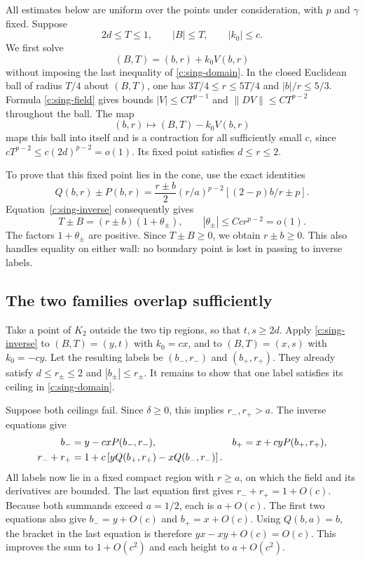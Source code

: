 All estimates below are uniform over the points under consideration,
with $p$ and $\gamma$ fixed.  Suppose
\[
 2d\le T\le1,\qquad |B|\le T,\qquad |k_0|\le c.
\]
We first solve
\begin{equation}
 (B,T)=(b,r)+k_0V(b,r)
 \label{c:sing-inverse}
\end{equation}
without imposing the last inequality of \eqref{c:sing-domain}.
In the closed Euclidean ball of radius $T/4$ about $(B,T)$, one has
$3T/4\le r\le5T/4$ and $|b|/r\le5/3$.  Formula
\eqref{c:sing-field} gives bounds
$|V|\le C T^{p-1}$ and $\|DV\|\le C T^{p-2}$ throughout the ball.
The map
\[
 (b,r)\longmapsto(B,T)-k_0V(b,r)
\]
maps this ball into itself and is a contraction for all sufficiently
small $c$, since $cT^{p-2}\le c(2d)^{p-2}=o(1)$.
Its fixed point satisfies $d\le r\le2$.

To prove that this fixed point lies in the cone, use the exact identities
\begin{equation}
 Q(b,r)\pm P(b,r)
   =\frac{r\pm b}{2}(r/a)^{p-2}
                      \left[(2-p)b/r\pm p\right].
 \label{c:sing-wall-factorization}
\end{equation}
Equation~\eqref{c:sing-inverse} consequently gives
\[
 T\pm B=(r\pm b)(1+\theta_\pm),\qquad
 |\theta_\pm|\le Cc r^{p-2}=o(1).
\]
The factors $1+\theta_\pm$ are positive.  Since $T\pm B\ge0$, we
obtain $r\pm b\ge0$.  This also handles equality on either wall:
no boundary point is lost in passing to inverse labels.

\subsection{The two families overlap sufficiently}

Take a point of $K_2$ outside the two tip regions, so that
$t,s\ge2d$.  Apply \eqref{c:sing-inverse} to $(B,T)=(y,t)$
with $k_0=cx$, and to $(B,T)=(x,s)$ with $k_0=-cy$.
Let the resulting labels be $(b_-,r_-)$ and $(b_+,r_+)$.
They already satisfy $d\le r_\pm\le2$ and $|b_\pm|\le r_\pm$.
It remains to show that one label satisfies its ceiling in
\eqref{c:sing-domain}.

Suppose both ceilings fail.  Since $\delta\ge0$, this implies
$r_-,r_+>a$.  The inverse equations give
\begin{align}
 b_-&=y-cxP(b_-,r_-),&
 b_+&=x+cyP(b_+,r_+),\notag\\
 r_-+r_+&=1+c\left[yQ(b_+,r_+)-xQ(b_-,r_-)\right].
 \label{c:sing-inverse-sum}
\end{align}
All labels now lie in a fixed compact region with $r\ge a$, on which
the field and its derivatives are bounded.  The last equation first
gives $r_-+r_+=1+O(c)$.  Because both summands exceed $a=1/2$,
each is $a+O(c)$.  The first two equations also give
$b_-=y+O(c)$ and $b_+=x+O(c)$.
Using $Q(b,a)=b$, the bracket in the last equation is therefore
$yx-xy+O(c)=O(c)$.  This improves the sum to $1+O(c^2)$ and
each height to $a+O(c^2)$.

